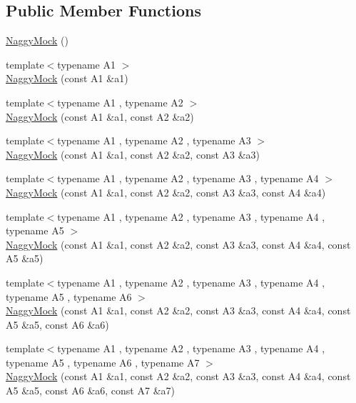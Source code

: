 \subsection*{Public Member Functions}
\begin{DoxyCompactItemize}
\item 
\hyperlink{classtesting_1_1_naggy_mock_acb769f78b93eb60b04db21250f416f70}{Naggy\+Mock} ()
\item 
{\footnotesize template$<$typename A1 $>$ }\\\hyperlink{classtesting_1_1_naggy_mock_ae43ea6c6a6b66fe31cb14f93e0be5718}{Naggy\+Mock} (const A1 \&a1)
\item 
{\footnotesize template$<$typename A1 , typename A2 $>$ }\\\hyperlink{classtesting_1_1_naggy_mock_a4241363ab2ca3a2e7baa5ead980175e6}{Naggy\+Mock} (const A1 \&a1, const A2 \&a2)
\item 
{\footnotesize template$<$typename A1 , typename A2 , typename A3 $>$ }\\\hyperlink{classtesting_1_1_naggy_mock_abd9eea0573bf39f4b41504b2d1df5311}{Naggy\+Mock} (const A1 \&a1, const A2 \&a2, const A3 \&a3)
\item 
{\footnotesize template$<$typename A1 , typename A2 , typename A3 , typename A4 $>$ }\\\hyperlink{classtesting_1_1_naggy_mock_aa7d63f62600171db931c6bbb4c2a6d52}{Naggy\+Mock} (const A1 \&a1, const A2 \&a2, const A3 \&a3, const A4 \&a4)
\item 
{\footnotesize template$<$typename A1 , typename A2 , typename A3 , typename A4 , typename A5 $>$ }\\\hyperlink{classtesting_1_1_naggy_mock_ac751c8a708935bd8558c9665160f7144}{Naggy\+Mock} (const A1 \&a1, const A2 \&a2, const A3 \&a3, const A4 \&a4, const A5 \&a5)
\item 
{\footnotesize template$<$typename A1 , typename A2 , typename A3 , typename A4 , typename A5 , typename A6 $>$ }\\\hyperlink{classtesting_1_1_naggy_mock_aac4c0986e917a5d6e515f8dc0e7bf644}{Naggy\+Mock} (const A1 \&a1, const A2 \&a2, const A3 \&a3, const A4 \&a4, const A5 \&a5, const A6 \&a6)
\item 
{\footnotesize template$<$typename A1 , typename A2 , typename A3 , typename A4 , typename A5 , typename A6 , typename A7 $>$ }\\\hyperlink{classtesting_1_1_naggy_mock_ad1edac1991dd20514e822c90d6896c74}{Naggy\+Mock} (const A1 \&a1, const A2 \&a2, const A3 \&a3, const A4 \&a4, const A5 \&a5, const A6 \&a6, const A7 \&a7)

\end{DoxyCompactItemize}
